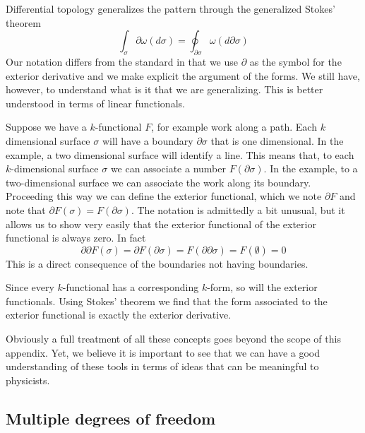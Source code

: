 \documentclass[10pt,twocolumn, nofootinbib]{revtex4-2}
\begin{document}
Differential topology generalizes the pattern through the generalized Stokes' theorem
\begin{equation*}
	\int_\sigma \partial \omega(d\sigma) = \oint_{\partial \sigma} \omega(d\partial\sigma)
\end{equation*}
Our notation differs from the standard in that we use $\partial$ as the symbol for the exterior derivative and we make explicit the argument of the forms. We still have, however, to understand what is it that we are generalizing. This is better understood in terms of linear functionals.

Suppose we have a $k$-functional $F$, for example work along a path. Each $k$ dimensional surface $\sigma$ will have a boundary $\partial \sigma$ that is one dimensional. In the example, a two dimensional surface will identify a line. This means that, to each $k$-dimensional surface $\sigma$ we can associate a number $F(\partial \sigma)$. In the example, to a two-dimensional surface we can associate the work along its boundary. Proceeding this way we can define the exterior functional, which we note $\partial F$ and note that $\partial F(\sigma) = F(\partial \sigma)$. The notation is admittedly a bit unusual, but it allows us to show very easily that the exterior functional of the exterior functional is always zero. In fact
\begin{equation*}
	\partial \partial F(\sigma) = \partial F(\partial \sigma) = F(\partial \partial \sigma) = F(\emptyset) = 0
\end{equation*}
This is a direct consequence of the boundaries not having boundaries.

Since every $k$-functional has a corresponding $k$-form, so will the exterior functionals. Using Stokes' theorem we find that the form associated to the exterior functional is exactly the exterior derivative.

Obviously a full treatment of all these concepts goes beyond the scope of this appendix. Yet, we believe it is important to see that we can have a good understanding of these tools in terms of ideas that can be meaningful to physicists. 

\fi

\subsection*{Multiple degrees of freedom}
\end{document}
